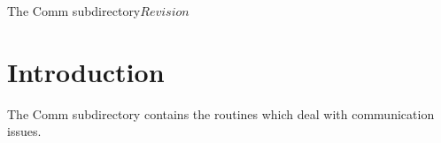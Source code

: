 %   

\begin{cactuspart}{6}{The Comm subdirectory}{}{$Revision$}
\renewcommand{\thepage}{\Alph{part}\arabic{page}}

\chapter{Introduction}

The Comm subdirectory contains the routines which deal with communication issues.

\end{cactuspart}
